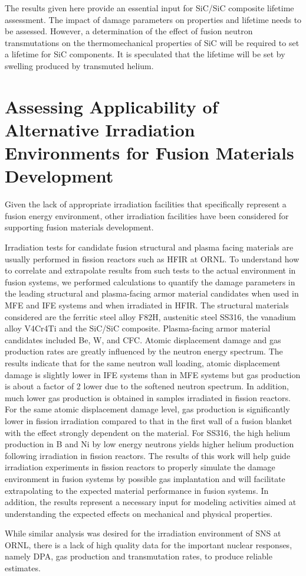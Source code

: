 The results given here provide an essential input for SiC/SiC composite
lifetime assessment. The impact of damage parameters on properties and
lifetime needs to be assessed. However, a determination of the effect of
fusion neutron transmutations on the thermomechanical properties of SiC will
be required to set a lifetime for SiC components. It is speculated that the
lifetime will be set by swelling produced by transmuted
helium.

\section{Assessing Applicability of Alternative Irradiation Environments for Fusion Materials Development}

Given the lack of appropriate irradiation facilities that specifically
represent a fusion energy environment, other irradiation facilities have been
considered for supporting fusion materials development.

Irradiation tests for candidate fusion structural and plasma facing materials
are usually performed in fission reactors such as \gls{HFIR} at \gls{ORNL}. To
understand how to correlate and extrapolate results from such tests to the
actual environment in fusion systems, we performed calculations to quantify
the damage parameters in the leading structural and plasma-facing armor
material candidates when used in \gls{MFE} and \gls{IFE} systems and when
irradiated in \gls{HFIR}. The structural materials considered are the ferritic
steel alloy F82H, austenitic steel SS316, the vanadium alloy V4Cr4Ti and the
SiC/SiC composite. Plasma-facing armor material candidates included Be, W, and
\gls{CFC}.  Atomic displacement damage and gas production rates are greatly
influenced by the neutron energy spectrum. The results indicate that for the
same neutron wall loading, atomic displacement damage is slightly lower in
\gls{IFE} systems than in \gls{MFE} systems but gas production is about a
factor of 2 lower due to the softened neutron spectrum. In addition, much
lower gas production is obtained in samples irradiated in fission
reactors. For the same atomic displacement damage level, gas production is
significantly lower in fission irradiation compared to that in the first wall
of a fusion blanket with the effect strongly dependent on the material. For
SS316, the high helium production in B and Ni by low energy neutrons yields
higher helium production following irradiation in fission reactors. The
results of this work will help guide irradiation experiments in fission
reactors to properly simulate the damage environment in fusion systems by
possible gas implantation and will facilitate extrapolating to the expected
material performance in fusion systems. In addition, the results represent a
necessary input for modeling activities aimed at understanding the expected
effects on mechanical and physical properties.

While similar analysis was desired for the irradiation environment of
\gls{SNS} at \gls{ORNL}, there is a lack of high quality data for the
important nuclear responses, namely DPA, gas production and transmutation
rates, to produce reliable estimates.







